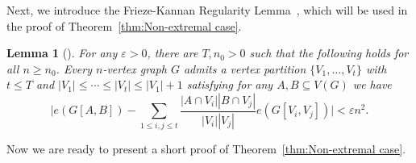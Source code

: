 \documentclass[11pt, a4paper]{article}
\newtheorem{lemma}[theorem]{Lemma}
\theoremstyle{definition}
\newcommand{\eps}{\varepsilon}
\newcommand{\<}{\subseteq}
\begin{document}
Next, we introduce the Frieze-Kannan Regularity Lemma~\cite{Frieze}, which will be used in the proof of Theorem~\ref{thm:Non-extremal case}.%
\begin{lemma}[\cite{Frieze}]\label{partition}
    For any $\eps>0$, there are $T,n_0>0$ such that the following holds for all $n\geq n_0$. Every $n$-vertex graph $G$ admits a vertex partition $\{V_1,\ldots,V_t\}$  with $t\leq T$ and $|V_1|\leq \cdots\leq |V_t|\leq |V_1|+1$ satisfying for any $A,B\subseteq V(G)$ we have 
    $$
    \Big|e(G[A,B])-\sum_{1\le i,j\le t}\frac{|A\cap V_i||B\cap V_j|}{|V_i||V_j|}e(G[V_i,V_j])\Big|<\eps n^2.
    $$
\end{lemma}
\medskip


Now we are ready to present a short proof of Theorem~\ref{thm:Non-extremal case}.%
\end{document}
